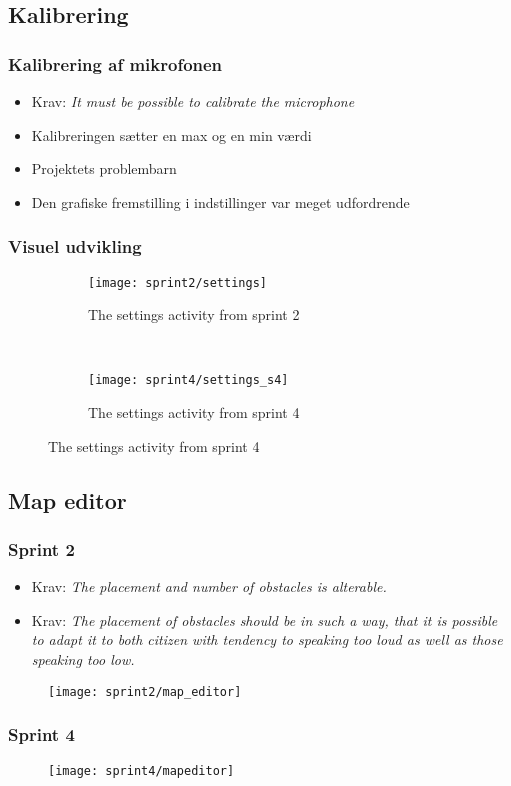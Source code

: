 \subsection{Kalibrering}
\begin{frame}
\frametitle{Kalibrering af mikrofonen}
\begin{itemize}
\item Krav: \textit{It must be possible to calibrate the microphone}
\item Kalibreringen sætter en max og en min værdi
\item Projektets problembarn
\item Den grafiske fremstilling i indstillinger var meget udfordrende
\end{itemize}
\end{frame}

\begin{frame}
\frametitle{Visuel udvikling}
\begin{figure}
\begin{subfigure}[b]{0.4\textwidth}
\texttt{[image: sprint2/settings]}
\caption{The settings activity from sprint 2}
\end{subfigure}
~
\begin{subfigure}[b]{0.4\textwidth}
\texttt{[image: sprint4/settings\_s4]}
\caption{The settings activity from sprint 4}
\end{subfigure}
\end{figure}
\end{frame}


\subsection{Map editor}
\begin{frame}
\frametitle{Sprint 2}
\begin{itemize}
\item Krav: \textit{The placement and number of obstacles is alterable.}
\item Krav: \textit{The placement of obstacles should be
in such a way,
that it is possible to adapt it to both citizen
with tendency to speaking too loud
as well as those speaking too low.}
\end{itemize}
\begin{figure}[h]
\texttt{[image: sprint2/map\_editor]}
\end{figure}
\end{frame}

\begin{frame}
\frametitle{Sprint 4}
\begin{figure}[h]
\texttt{[image: sprint4/mapeditor]}
\end{figure}
\end{frame}

